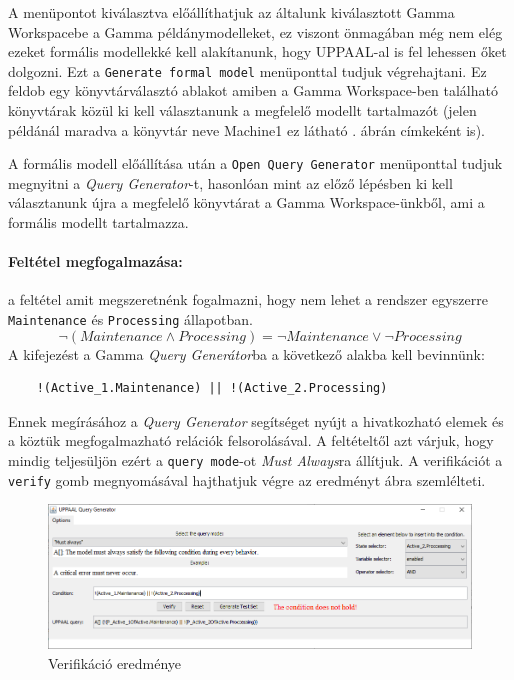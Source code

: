 A menüpontot kiválasztva előállíthatjuk az általunk kiválasztott Gamma Workspacebe a Gamma példánymodelleket, ez viszont önmagában még nem elég ezeket formális modellekké kell alakítanunk, hogy UPPAAL-al is fel lehessen őket dolgozni. Ezt a \verb+Generate formal model+ menüponttal tudjuk végrehajtani. Ez feldob egy könyvtárválasztó ablakot amiben a Gamma Workspace-ben található könyvtárak közül ki kell választanunk a megfelelő modellt tartalmazót (jelen példánál maradva a könyvtár neve Machine1 ez látható . ábrán címkeként is).

A formális modell előállítása után a \verb+Open Query Generator+ menüponttal tudjuk megnyitni a \emph{Query Generator}-t, hasonlóan mint az előző lépésben ki kell választanunk újra a megfelelő könyvtárat a Gamma Workspace-ünkből, ami a formális modellt tartalmazza.

\paragraph{Feltétel megfogalmazása: } a feltétel amit megszeretnénk fogalmazni, hogy nem lehet a rendszer egyszerre \verb+Maintenance+ és \verb+Processing+ állapotban.
\[ \neg(Maintenance  \land Processing) = \neg Maintenance \lor \neg Processing \]
A kifejezést a Gamma \emph{Query Generátor}ba a következő alakba kell bevinnünk:
\begin{lstlisting}
	!(Active_1.Maintenance) || !(Active_2.Processing)
\end{lstlisting}
Ennek megírásához a \emph{Query Generator} segítséget nyújt a hivatkozható elemek és a köztük megfogalmazható relációk felsorolásával. A feltételtől azt várjuk, hogy mindig teljesüljön ezért a \verb+query mode+-ot \emph{Must Always}ra állítjuk. A verifikációt a \verb+verify+ gomb megnyomásával hajthatjuk végre az eredményt   ábra szemlélteti.
\begin{figure}[H]
	\centering
	\includegraphics[keepaspectratio, width=150mm]{figures/query-gen-result.png}
	\caption{Verifikáció eredménye}
	\label{fig:query-gen-res}
\end{figure}

